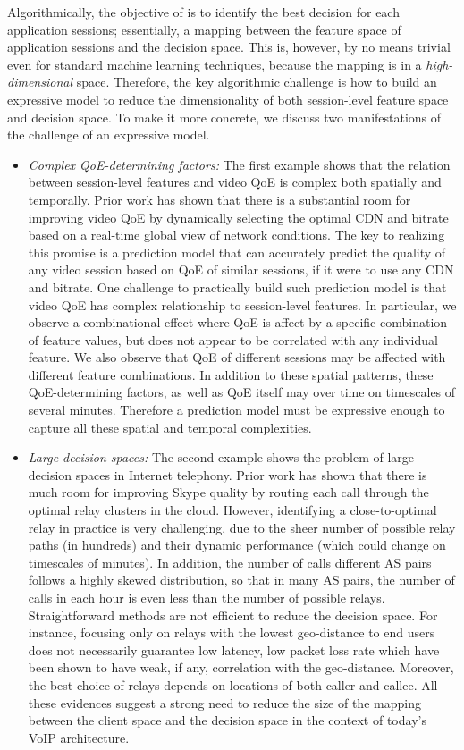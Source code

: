 Algorithmically, the objective of \ddn is to identify 
the best decision for each application sessions;
essentially, a mapping between the feature space
of application sessions and the decision space.
This is, however, by no means trivial even for 
standard machine learning techniques,
because the mapping is in a 
{\em high-dimensional} space.
Therefore, the key algorithmic challenge is 
how to build an expressive model to reduce
the dimensionality of both session-level 
feature space and decision space.
To make it more concrete, we discuss two
manifestations of the challenge of an expressive
model.

\begin{itemize}

\item {\em Complex QoE-determining factors:} 
The first example shows that the relation between
session-level features and video QoE is complex
both spatially and temporally.
Prior work has shown that there is a substantial room for 
improving video QoE by dynamically selecting the 
optimal CDN and bitrate based on a real-time global 
view of network conditions.
The key to realizing this promise is a prediction 
model that can accurately predict the quality of any 
video session based on QoE of similar sessions,
if it were to use any CDN and bitrate.
One challenge to practically build such prediction 
model is that video QoE has complex relationship to 
session-level features.
In particular, we observe a combinational effect
where QoE is affect by a specific combination 
of feature values, but does not appear to be 
correlated with any individual feature.
We also observe that QoE of different sessions 
may be affected with different feature combinations.
In addition to these spatial patterns, these 
QoE-determining factors, as well as QoE itself may
over time on timescales of several minutes.
Therefore a prediction model must be expressive
enough to capture all these spatial and temporal
complexities.

\item {\em Large decision spaces:}
The second example shows the problem of 
large decision spaces in Internet telephony.
Prior work has shown that there is much room 
for improving Skype quality by routing each 
call through the optimal relay clusters in 
the cloud.
However, identifying a close-to-optimal relay 
in practice is very challenging, due to the sheer 
number of possible relay paths (in hundreds) and 
their dynamic performance (which could change 
on timescales of minutes). 
In addition, the number of calls different AS pairs
follows a highly skewed distribution, so that
in many AS pairs, the number of calls in each 
hour is even less than the number of possible 
relays.
Straightforward methods are not 
efficient to reduce the decision space.
For instance, focusing only on relays with 
the lowest geo-distance to end users
does not necessarily guarantee low latency, 
low packet loss rate which have been shown
to have weak, if any, correlation with the geo-distance.
Moreover, the best choice of relays depends 
on locations of both caller and callee.
All these evidences suggest a strong need
to reduce the size of the mapping between
the client space and the decision space in 
the context of today's VoIP architecture.


\end{itemize}
